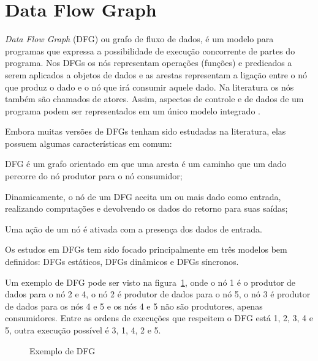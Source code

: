 
\section{Data Flow Graph}

\textit{Data Flow Graph} (DFG) ou grafo de fluxo de dados, é um modelo para 
programas que expressa a possibilidade de execução concorrente de partes do
programa. 
Nos DFGs os nós representam operações (funções) e predicados a serem
aplicados a objetos de dados e as arestas representam a ligação entre o nó que
produz o dado e o nó que irá consumir aquele dado.
Na literatura os nós também são chamados de atores.
Assim, aspectos de controle e de dados de um programa podem ser representados 
em um único modelo integrado \cite{eopc}.

Embora muitas versões de DFGs tenham sido estudadas na literatura, elas possuem 
algumas características em comum:

\begin{alineas}
        \item DFG é um grafo orientado em que uma aresta é um caminho que um dado
        percorre do nó produtor para o nó consumidor;
        \item Dinamicamente, o nó de um DFG aceita um ou mais dado como entrada,
        realizando computações e devolvendo os dados do retorno para suas
        saídas;
        \item Uma ação de um nó é ativada com a presença dos dados de entrada.
\end{alineas}

Os estudos em DFGs tem sido focado principalmente em três modelos bem definidos:
DFGs estáticos, DFGs dinâmicos e DFGs síncronos.

Um exemplo de DFG pode ser visto na figura~\ref{dfg_ex}, onde o nó 1 é o
produtor de dados para o nó 2 e 4, o nó 2 é produtor de dados para o nó 5, 
o nó 3 é produtor de dados para os nós 4 e 5 e os nós 4 e 5 não são produtores,
apenas consumidores. Entre as ordens de execuções que respeitem o DFG está 
1, 2, 3, 4 e 5, outra execução possível é 3, 1, 4, 2 e 5.

\begin{figure}[h]
\centering
\label{dfg_ex}
\caption{Exemplo de DFG}
\end{figure}




